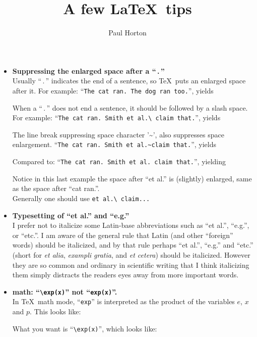 \documentclass{article}
\title{A few \LaTeX\ tips}
\author{Paul Horton}
\newcommand*\itembf[1]{\item \textbf{#1}\\}
\begin{document}
\maketitle


\begin{itemize}
\itembf{Suppressing the enlarged space after a ``\,.\,''}
Usually ``\,.\,'' indicates the end of a sentence, so \TeX\ puts an enlarged space after it.
For example: ``\texttt{The cat ran.  The dog ran too.}'', yields
\begin{center}\end{center}
When a ``\,.\,'' does not end a sentence, it should be followed by a slash space.
%
For example: ``\texttt{The cat ran.  Smith et al.\textbackslash\ claim that.}'', yields
\begin{center}\end{center}
%
The line break suppressing space character '\textasciitilde', also suppresses space enlargement.
``\texttt{The cat ran.  Smith et al.\textasciitilde claim that.}'', yields
\begin{center}\end{center}
%
Compared to: ``\texttt{The cat ran.  Smith et al. claim that.}'', yielding
\begin{center}\end{center}
Notice in this last example the space after ``et al.'' is (slightly) enlarged, same as the space after ``cat ran.''.\\
Generally one should use \texttt{et al.\textbackslash\ claim...}


\itembf{Typesetting of ``et al.'' and ``e.g.''}
I prefer not to italicize some Latin-base abbreviations such as ``et al.'', ``e.g.'', or ``etc.''.
I am aware of the general rule that Latin (and other ``foreign'' words) should be italicized,
and by that rule perhaps ``et al.'', ``e.g.'' and ``etc.''
(short for \textit{et alia}, \textit{exampli gratia}, and \textit{et cetera}) should be italicized.
However they are so common and ordinary in scientific writing that I think italicizing them
simply distracts the readers eyes away from more important words.


\itembf{math: ``\texttt{\textbackslash exp(x)}'' not ``\texttt{exp(x)}''.}
In \TeX\ math mode, ``\texttt{exp}'' is interpreted as the product of the variables $e$, $x$ and $p$.
This looks like:
\begin{center}\end{center}
What you want is ``\texttt{\textbackslash exp(x)}'', which looks like:
\begin{center}\end{center}


\end{itemize}
\end{document}

